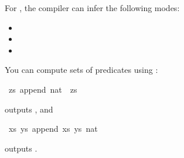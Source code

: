 \begin{isabellebody}
\begin{isamarkuptext}
For , the compiler can infer the following modes:
\begin{itemize}
\item {}
\item {}
\item {}
\end{itemize}
You can compute sets of predicates using \hypertarget{command.values}{\hyperlink{command.values}{\mbox{}}}:%
\end{isamarkuptext}%
\isamarkuptrue%
%
\isadelimquote
%
\endisadelimquote
%
\isatagquote
{}\isamarkupfalse%
\ {\isachardoublequoteopen}{\isacharbraceleft}zs{\isachardot}\ append\ {\isacharbrackleft}{\isacharparenleft}{}{\isacharcolon}{\isacharcolon}nat{\isacharparenright}{\isacharcomma}{}{\isacharcomma}{}{\isacharbrackright}\ {\isacharbrackleft}{}{\isacharcomma}{}{\isacharbrackright}\ zs{\isacharbraceright}{\isachardoublequoteclose}%
\endisatagquote
{\isafoldquote}%
%
\isadelimquote
%
\endisadelimquote
%
\begin{isamarkuptext}%
\noindent outputs , and%
\end{isamarkuptext}%
\isamarkuptrue%
%
\isadelimquote
%
\endisadelimquote
%
\isatagquote
{}\isamarkupfalse%
\ {\isachardoublequoteopen}{\isacharbraceleft}{\isacharparenleft}xs{\isacharcomma}\ ys{\isacharparenright}{\isachardot}\ append\ xs\ ys\ {\isacharbrackleft}{\isacharparenleft}{}{\isacharcolon}{\isacharcolon}nat{\isacharparenright}{\isacharcomma}{}{\isacharbrackright}{\isacharbraceright}{\isachardoublequoteclose}%
\endisatagquote
{\isafoldquote}%
%
\isadelimquote
%
\endisadelimquote
%
\begin{isamarkuptext}%
\noindent outputs .%

\end{isamarkuptext}
\end{isabellebody}
